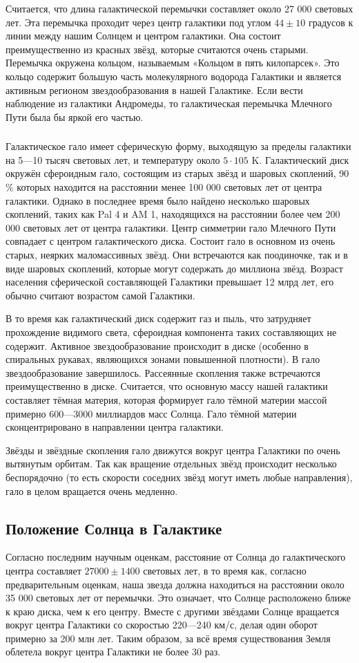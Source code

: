 Считается, что длина галактической перемычки составляет около 27 000 световых лет. Эта перемычка проходит через центр галактики под углом $44 \pm 10$ градусов к линии между нашим Солнцем и центром галактики. Она состоит преимущественно из красных звёзд, которые считаются очень старыми. Перемычка окружена кольцом, называемым «Кольцом в пять килопарсек». Это кольцо содержит большую часть молекулярного водорода Галактики и является активным регионом звездообразования в нашей Галактике. Если вести наблюдение из галактики Андромеды, то галактическая перемычка Млечного Пути была бы яркой его частью.
\subsubsection{}
Галактическое гало имеет сферическую форму, выходящую за пределы галактики на 5—10 тысяч световых лет, и температуру около $5\cdot105$ K. Галактический диск окружён сфероидным гало, состоящим из старых звёзд и шаровых скоплений, 90 \% которых находится на расстоянии менее 100 000 световых лет от центра галактики. Однако в последнее время было найдено несколько шаровых скоплений, таких как Pal 4 и AM 1, находящихся на расстоянии более чем 200 000 световых лет от центра галактики. Центр симметрии гало Млечного Пути совпадает с центром галактического диска. Состоит гало в основном из очень старых, неярких маломассивных звёзд. Они встречаются как поодиночке, так и в виде шаровых скоплений, которые могут содержать до миллиона звёзд. Возраст населения сферической составляющей Галактики превышает 12 млрд лет, его обычно считают возрастом самой Галактики.

В то время как галактический диск содержит газ и пыль, что затрудняет прохождение видимого света, сфероидная компонента таких составляющих не содержит. Активное звездообразование происходит в диске (особенно в спиральных рукавах, являющихся зонами повышенной плотности). В гало звездообразование завершилось. Рассеянные скопления также встречаются преимущественно в диске. Считается, что основную массу нашей галактики составляет тёмная материя, которая формирует гало тёмной материи массой примерно 600—3000 миллиардов масс Солнца. Гало тёмной материи сконцентрировано в направлении центра галактики.

Звёзды и звёздные скопления гало движутся вокруг центра Галактики по очень вытянутым орбитам. Так как вращение отдельных звёзд происходит несколько беспорядочно (то есть скорости соседних звёзд могут иметь любые направления), гало в целом вращается очень медленно.
\subsection{Положение Солнца в Галактике}
Согласно последним научным оценкам, расстояние от Солнца до галактического центра составляет $27 000 \pm 1 400$ световых лет, в то время как, согласно предварительным оценкам, наша звезда должна находиться на расстоянии около 35 000 световых лет от перемычки. Это означает, что Солнце расположено ближе к краю диска, чем к его центру. Вместе с другими звёздами Солнце вращается вокруг центра Галактики со скоростью 220—240 км/с, делая один оборот примерно за 200 млн лет. Таким образом, за всё время существования Земля облетела вокруг центра Галактики не более 30 раз.
